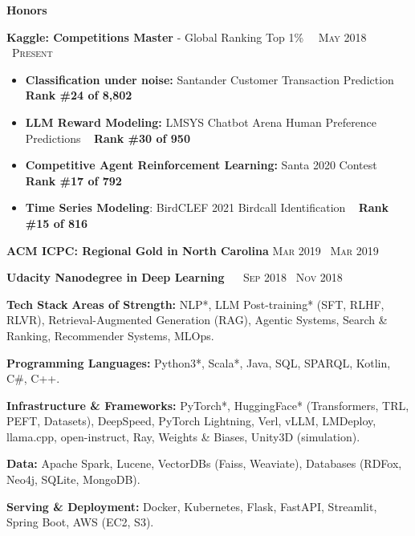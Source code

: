 \documentclass{resume} %
\begin{document}
\vspace{2mm}
\begin{rSection}{\Large \textbf{Honors}}

{\bf Kaggle: Competitions Master} - Global Ranking Top 1\% \ \ \hfill  \textsc{May 2018  \textendash\  Present}

{\begin{itemize} [topsep=-1px,partopsep= 0px, itemsep=0px]
\item \textbf{Classification under noise:} Santander Customer Transaction Prediction \  {{\href{https://www.kaggle.com/certification/competitions/billbafare/santander-customer-transaction-prediction}{\faLink}}}   \hfill \textbf{Rank \#24 of 8,802} \
\item \textbf{LLM Reward Modeling:} LMSYS Chatbot Arena Human Preference Predictions \  {{\href{https://www.kaggle.com/certification/competitions/billbafare/wsdm-cup-multilingual-chatbot-arena}{\faLink}}}  \hfill  \textbf{Rank \#30 of 950} \
\item \textbf{Competitive Agent Reinforcement Learning:} Santa 2020 Contest  \  {{\href{https://www.kaggle.com/certification/competitions/billbafare/santa-2020}{\faLink}}} \hfill  \textbf{Rank \#17 of 792} \
\item \textbf{Time Series Modeling}: BirdCLEF 2021 Birdcall Identification  \  {{\href{https://www.kaggle.com/certification/competitions/billbafare/birdclef-2021}{\faLink}}}  \hfill \textbf{Rank \#15 of 816} \





\end{itemize}}
\vspace{1mm}
{\bf ACM ICPC: Regional Gold in North Carolina} \hfill \textsc{Mar 2019  \textendash\  Mar 2019}

{\bf Udacity Nanodegree in Deep Learning} \ \  {{\href{https://confirm.udacity.com/APWFNQDV/}{\faLink}}} \hfill \textsc{Sep 2018  \textendash\ Nov 2018}
\end{rSection}




\vspace{2mm}
\begin{rSection}{\Large \textbf{Tech Stack}}
\vspace{1mm}
{\bf Areas of Strength:} NLP*, LLM Post-training* (SFT, RLHF, RLVR), Retrieval-Augmented Generation (RAG), Agentic Systems, Search \& Ranking, Recommender Systems, MLOps.

{\bf Programming Languages:} Python3*, Scala*, Java, SQL, SPARQL, Kotlin, C\#, C++.

{\bf Infrastructure \& Frameworks:} PyTorch*, HuggingFace* (Transformers, TRL, PEFT, Datasets), DeepSpeed, PyTorch Lightning, Verl, vLLM, LMDeploy, llama.cpp, open-instruct, Ray, Weights \& Biases, Unity3D (simulation).

{\bf Data:} Apache Spark, Lucene, VectorDBs (Faiss, Weaviate), Databases (RDFox, Neo4j, SQLite, MongoDB).

{\bf Serving \& Deployment:} Docker, Kubernetes, Flask, FastAPI, Streamlit, Spring Boot, AWS (EC2, S3).


\end{rSection}
\end{document}
